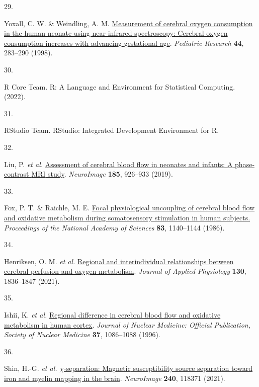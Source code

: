 \documentclass[
  letterpaper,
  DIV=11,
  numbers=noendperiod]{scrartcl}
\newlength{\cslhangindent}
\newlength{\csllabelwidth}
\newenvironment{CSLReferences}[2] %
 {\begin{list}{}{%
  \setlength{\itemindent}{0pt}
  \setlength{\leftmargin}{0pt}
  \setlength{\parsep}{0pt}
  \ifodd #1
   \setlength{\leftmargin}{\cslhangindent}
   \setlength{\itemindent}{-1\cslhangindent}
  \fi
  \setlength{\itemsep}{#2\baselineskip}}}
 {\end{list}}
\newcommand{\CSLLeftMargin}[1]{\parbox[t]{\csllabelwidth}{\strut#1\strut}}
\newcommand{\CSLRightInline}[1]{\parbox[t]{\linewidth - \csllabelwidth}{\strut#1\strut}}
\begin{document}
\begin{CSLReferences}{0}{0}
\CSLLeftMargin{29. }%
\CSLRightInline{Yoxall, C. W. \& Weindling, A. M.
\href{https://doi.org/10.1203/00006450-199809000-00004}{Measurement of
cerebral oxygen consumption in the human neonate using near infrared
spectroscopy: Cerebral oxygen consumption increases with advancing
gestational age}. \emph{Pediatric Research} \textbf{44}, 283--290
(1998).}

\CSLLeftMargin{30. }%
\CSLRightInline{R Core Team. R: {A Language} and {Environment} for
{Statistical Computing}. (2022).}

\CSLLeftMargin{31. }%
\CSLRightInline{RStudio Team. {RStudio}: {Integrated Development
Environment} for {R}.}

\CSLLeftMargin{32. }%
\CSLRightInline{Liu, P. \emph{et al.}
\href{https://doi.org/10.1016/j.neuroimage.2018.03.020}{Assessment of
cerebral blood flow in neonates and infants: {A} phase-contrast {MRI}
study}. \emph{NeuroImage} \textbf{185}, 926--933 (2019).}

\CSLLeftMargin{33. }%
\CSLRightInline{Fox, P. T. \& Raichle, M. E.
\href{https://doi.org/10.1073/pnas.83.4.1140}{Focal physiological
uncoupling of cerebral blood flow and oxidative metabolism during
somatosensory stimulation in human subjects.} \emph{Proceedings of the
National Academy of Sciences} \textbf{83}, 1140--1144 (1986).}

\CSLLeftMargin{34. }%
\CSLRightInline{Henriksen, O. M. \emph{et al.}
\href{https://doi.org/10.1152/japplphysiol.00939.2020}{Regional and
interindividual relationships between cerebral perfusion and oxygen
metabolism}. \emph{Journal of Applied Physiology} \textbf{130},
1836--1847 (2021).}

\CSLLeftMargin{35. }%
\CSLRightInline{Ishii, K. \emph{et al.}
\href{https://www.ncbi.nlm.nih.gov/pubmed/8965174}{Regional difference
in cerebral blood flow and oxidative metabolism in human cortex}.
\emph{Journal of Nuclear Medicine: Official Publication, Society of
Nuclear Medicine} \textbf{37}, 1086--1088 (1996).}

\CSLLeftMargin{36. }%
\CSLRightInline{Shin, H.-G. \emph{et al.}
\href{https://doi.org/10.1016/j.neuroimage.2021.118371}{{\(\chi\)}-separation:
{Magnetic} susceptibility source separation toward iron and myelin
mapping in the brain}. \emph{NeuroImage} \textbf{240}, 118371 (2021).}


\end{CSLReferences}
\end{document}
